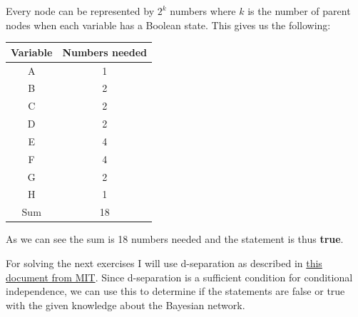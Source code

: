 \documentclass[10pt, a4paper, english]{../Template/NTNUoving}
\begin{document}
\begin{oppgave}
    \begin{punkt}
        Every node can be represented by $2^k$ numbers where $k$ is the number of parent nodes when each variable has a Boolean state.
        This gives us the following:
        \begin{center}
            \begin{tabular}{ |c|c| }
             \hline
             Variable & Numbers needed \\
             \hline
             A  & 1 \\
             \hline
             B &  2 \\
             \hline
             C &  2 \\
             \hline
             D &  2 \\
             \hline
             E &  4 \\
             \hline
             F &  4 \\
             \hline
             G &  2 \\
             \hline
             H &  1 \\
             \hline
             Sum &  18 \\
             \hline
            \end{tabular}
            \end{center}
            As we can see the sum is 18 numbers needed and the statement is thus \textbf{true}.
    \end{punkt}

    For solving the next exercises I will use d-separation as described in \href{http://web.mit.edu/jmn/www/6.034/d-separation.pdf}{this document from MIT}.
    Since d-separation is a sufficient condition for conditional independence, we can use this to determine if the statements are false or true with the given knowledge about the Bayesian network.


\end{oppgave}
\end{document}
